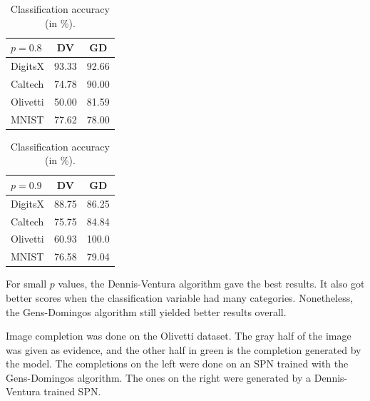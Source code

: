 \documentclass[final,hyperref={pdfpagelabels=false},notheorems]{beamer}
\theoremstyle{thesisstyle}
\newcommand{\pskip}{\vskip 0.5cm}
\begin{document}
\begin{frame}[t]
\begin{columns}[t]
\begin{column}{.5225\textwidth}
\begin{block}{}
\begin{table}[h]
        \begin{tabular}{l|c|c}
          $p=0.8$ & DV & GD\\
          \hline
          DigitsX & 93.33 & 92.66\\
          Caltech & 74.78 & 90.00\\
          Olivetti& 50.00 & 81.59\\
          MNIST   & 77.62 & 78.00\\
        \end{tabular}\hspace{2.5cm}
        \begin{tabular}{l|c|c}
          $p=0.9$ & DV & GD\\
          \hline
          DigitsX & 88.75 & 86.25\\
          Caltech & 75.75 & 84.84\\
          Olivetti& 60.93 & 100.0\\
          MNIST   & 76.58 & 79.04\\
        \end{tabular}
        \caption{Classification accuracy (in \%).}
      \end{table}

      For small $p$ values, the Dennis-Ventura algorithm gave the best results. It also got better
      scores when the classification variable had many categories. Nonetheless, the Gens-Domingos
      algorithm still yielded better results overall.\pskip

      Image completion was done on the Olivetti dataset. The gray half of the image was given as
      evidence, and the other half in green is the completion generated by the model. The
      completions on the left were done on an SPN trained with the Gens-Domingos algorithm. The
      ones on the right were generated by a Dennis-Ventura trained SPN.\pskip


\end{block}
\end{column}
\end{columns}
\end{frame}
\end{document}

